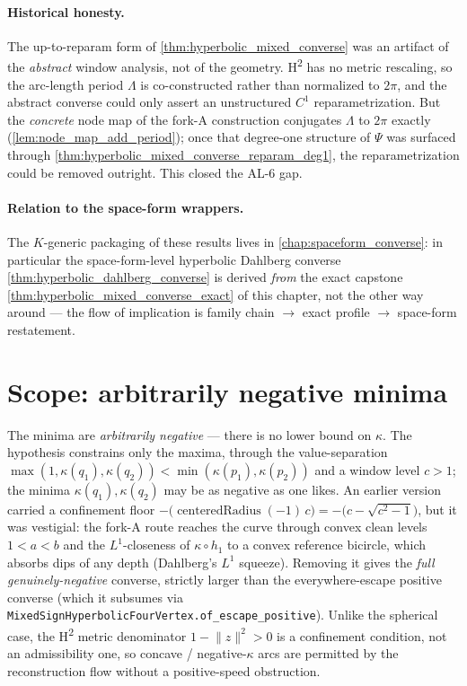 \paragraph{Historical honesty.}
The up-to-reparam form of \cref{thm:hyperbolic_mixed_converse} was an artifact
of the \emph{abstract} window analysis, not of the geometry.
H\textsuperscript{2} has no metric rescaling, so the arc-length period
$\Lambda$ is co-constructed rather than normalized to $2\pi$, and the abstract
converse could only assert an unstructured $C^1$ reparametrization. But the
\emph{concrete} node map of the fork-A construction conjugates $\Lambda$ to
$2\pi$ exactly (\cref{lem:node_map_add_period}); once that degree-one
structure of $\Psi$ was surfaced through
\cref{thm:hyperbolic_mixed_converse_reparam_deg1}, the reparametrization could
be removed outright. This closed the AL-6 gap.

\paragraph{Relation to the space-form wrappers.}
The $K$-generic packaging of these results lives in
\cref{chap:spaceform_converse}: in particular the space-form-level hyperbolic
Dahlberg converse \cref{thm:hyperbolic_dahlberg_converse} is derived
\emph{from} the exact capstone \cref{thm:hyperbolic_mixed_converse_exact} of
this chapter, not the other way around — the flow of implication is
family chain $\to$ exact profile $\to$ space-form restatement.

\section{Scope: arbitrarily negative minima}
\label{sec:hyperbolic_negative_scope}

The minima are \emph{arbitrarily negative} --- there is no lower bound on
$\kappa$. The hypothesis constrains only the maxima, through the value-separation
$\max(1,\kappa(q_1),\kappa(q_2))<\min(\kappa(p_1),\kappa(p_2))$ and a window level
$c>1$; the minima $\kappa(q_1),\kappa(q_2)$ may be as negative as one likes. An
earlier version carried a confinement floor
$-\bigl(\operatorname{centeredRadius}(-1)\,c\bigr)=-\bigl(c-\sqrt{c^2-1}\bigr)$,
but it was vestigial: the fork-A route reaches the curve through convex clean
levels $1<a<b$ and the $L^1$-closeness of $\kappa\circ h_1$ to a convex reference
bicircle, which absorbs dips of any depth (Dahlberg's $L^1$ squeeze). Removing it
gives the \emph{full genuinely-negative} converse, strictly larger than the
everywhere-escape positive converse (which it subsumes via
\texttt{MixedSignHyperbolicFourVertex.of\_escape\_positive}). Unlike the
spherical case, the H\textsuperscript{2} metric denominator
$1-\lVert z\rVert^2>0$ is a confinement condition, not an admissibility one,
so concave / negative-$\kappa$ arcs are permitted by the reconstruction flow
without a positive-speed obstruction.

